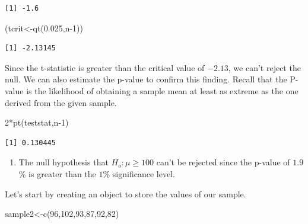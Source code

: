 \documentclass[
  letterpaper,
  DIV=11,
  numbers=noendperiod]{scrreprt}
\newenvironment{Shaded}{\begin{snugshade}}{\end{snugshade}}
\newcommand{\DecValTok}[1]{\textcolor[rgb]{0.68,0.00,0.00}{#1}}
\newcommand{\FloatTok}[1]{\textcolor[rgb]{0.68,0.00,0.00}{#1}}
\newcommand{\FunctionTok}[1]{\textcolor[rgb]{0.28,0.35,0.67}{#1}}
\newcommand{\NormalTok}[1]{\textcolor[rgb]{0.00,0.23,0.31}{#1}}
\newcommand{\OtherTok}[1]{\textcolor[rgb]{0.00,0.23,0.31}{#1}}
\newcommand{\SpecialCharTok}[1]{\textcolor[rgb]{0.37,0.37,0.37}{#1}}
\providecommand{\tightlist}{%
  \setlength{\itemsep}{0pt}\setlength{\parskip}{0pt}}\usepackage{longtable,booktabs,array}
\begin{document}
\begin{verbatim}
[1] -1.6
\end{verbatim}

\begin{Shaded}
\begin{Highlighting}[numbers=left,,]
\NormalTok{(tcrit}\OtherTok{\textless{}{-}}\FunctionTok{qt}\NormalTok{(}\FloatTok{0.025}\NormalTok{,n}\DecValTok{{-}1}\NormalTok{))}
\end{Highlighting}
\end{Shaded}

\begin{verbatim}
[1] -2.13145
\end{verbatim}

Since the t-statistic is greater than the critical value of \(-2.13\),
we can't reject the null. We can also estimate the p-value to confirm
this finding. Recall that the P-value is the likelihood of obtaining a
sample mean at least as extreme as the one derived from the given
sample.

\begin{Shaded}
\begin{Highlighting}[numbers=left,,]
\DecValTok{2}\SpecialCharTok{*}\FunctionTok{pt}\NormalTok{(teststat,n}\DecValTok{{-}1}\NormalTok{)}
\end{Highlighting}
\end{Shaded}

\begin{verbatim}
[1] 0.130445
\end{verbatim}

\begin{blackbox}

\begin{enumerate}
\def\labelenumi{\arabic{enumi}.}
\setcounter{enumi}{1}
\tightlist
\item
  The null hypothesis that \(H_{o}: \mu \geq 100\) can't be rejected
  since the p-value of \(1.9\)\% is greater than the \(1\)\%
  significance level.
\end{enumerate}

\end{blackbox}

Let's start by creating an object to store the values of our sample.

\begin{Shaded}
\begin{Highlighting}[numbers=left,,]
\NormalTok{sample2}\OtherTok{\textless{}{-}}\FunctionTok{c}\NormalTok{(}\DecValTok{96}\NormalTok{,}\DecValTok{102}\NormalTok{,}\DecValTok{93}\NormalTok{,}\DecValTok{87}\NormalTok{,}\DecValTok{92}\NormalTok{,}\DecValTok{82}\NormalTok{)}
\end{Highlighting}
\end{Shaded}
\end{document}
